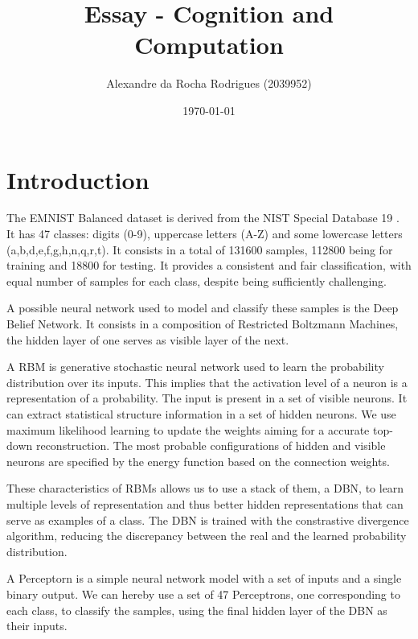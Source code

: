 \documentclass[a4paper, 11pt]{article}
\begin{document}
	
	\title{Essay - Cognition and Computation }
	\author{{\small Alexandre da Rocha Rodrigues (2039952)}}
	\date{\today}
	\maketitle
	
	\section{Introduction}
	
		The EMNIST  Balanced dataset is derived from the NIST Special Database 19 \cite{emnist}\cite{ExpEMNIST}.
		It has 47 classes: digits (0-9), uppercase letters (A-Z) and some lowercase letters (a,b,d,e,f,g,h,n,q,r,t).
		It consists in a total of 131600 samples, 112800 being for training and 18800 for testing.
		It provides a consistent and fair classification, with equal number of samples for each class, despite being sufficiently challenging. 
		
		A possible neural network used to model and classify these samples is the Deep Belief Network.
		It consists in a composition of Restricted Boltzmann Machines, the hidden layer of one serves as visible layer of the next.
		
		A RBM is generative stochastic neural network used to learn the probability distribution over its inputs.
		This implies that the activation level of a neuron is a representation of a probability.
		The input is present in a set of visible neurons.
		It can extract statistical structure information in a set of hidden neurons.
		We use maximum likelihood learning to update the weights aiming for a accurate top-down reconstruction.
		The most probable configurations of hidden and visible neurons are specified by the energy function based on the connection weights.
		
		These characteristics of RBMs allows us to use a stack of them, a DBN, to learn multiple levels of representation and thus better hidden representations that can serve as examples of a class.
		The DBN is trained with the constrastive divergence algorithm, reducing the discrepancy between the real and the learned probability distribution.
		
		A Perceptorn is a simple neural network model with a set of inputs and a single binary output.
		We can hereby use a set of 47 Perceptrons, one corresponding to each class, to classify the samples, using the final hidden layer of the DBN as their inputs.
		
\end{document}
